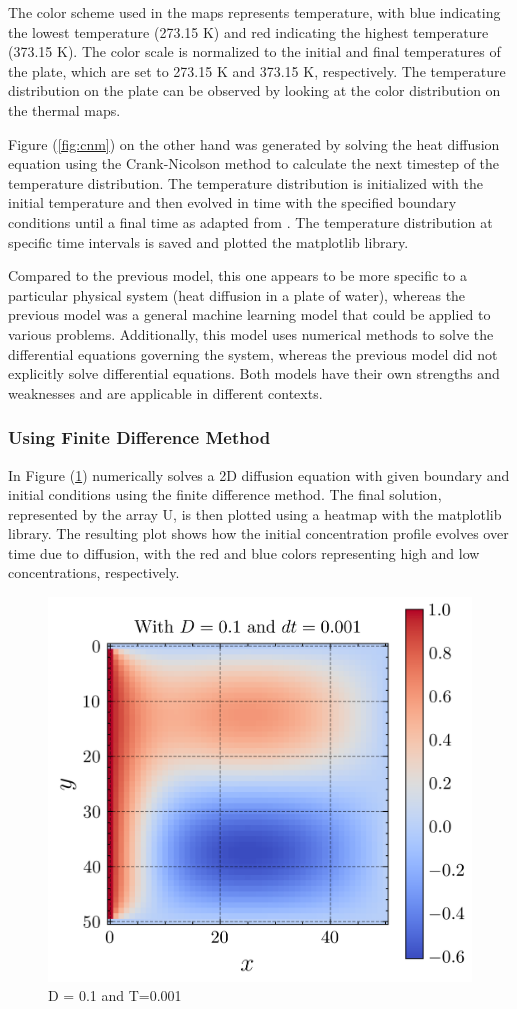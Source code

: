 The color scheme used in the maps represents temperature, with blue indicating the lowest temperature (273.15 K) and red indicating the highest temperature (373.15 K). The color scale is normalized to the initial and final temperatures of the plate, which are set to 273.15 K and 373.15 K, respectively. The temperature distribution on the plate can be observed by looking at the color distribution on the thermal maps.

Figure (\ref{fig:cnm}) on the other hand was generated by solving the heat diffusion equation using  the Crank-Nicolson method to calculate the next timestep of the temperature distribution. The temperature distribution is initialized with the initial temperature and then evolved in time with the specified boundary conditions until a final time as adapted from \cite{Arocha2018}. The temperature distribution at specific time intervals is saved and plotted the matplotlib library.

Compared to the previous model, this one appears to be more specific to a particular physical system (heat diffusion in a plate of water), whereas the previous model was a general machine learning model that could be applied to various problems. Additionally, this model uses numerical methods to solve the differential equations governing the system, whereas the previous model did not explicitly solve differential equations. Both models have their own strengths and weaknesses and are applicable in different contexts.

\subsubsection{Using Finite Difference Method}
In Figure (\ref{fig:fdmm}) numerically solves a 2D diffusion equation with given boundary and initial conditions using the finite difference method. The final solution, represented by the array U, is then plotted using a heatmap with the matplotlib library. The resulting plot shows how the initial concentration profile evolves over time due to diffusion, with the red and blue colors representing high and low concentrations, respectively. 

\begin{figure}[htb!]
\begin{center}
\includegraphics[width=.49\textwidth]{images/0.1_time.png}
\vspace*{-8mm}
\caption{D = 0.1 and T=0.001}
\label{fig:fdmm}
\end{center}
\end{figure}

